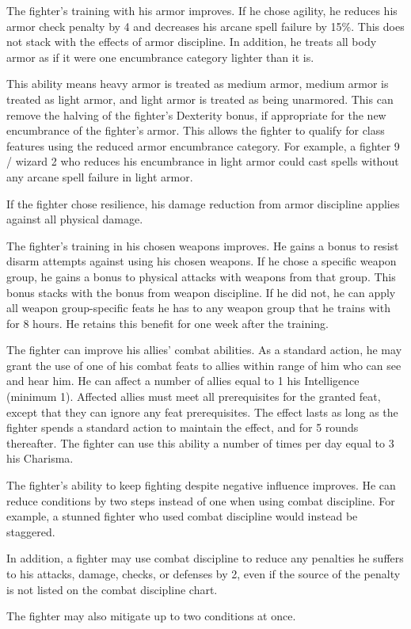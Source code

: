  The fighter's training with his armor improves. If he chose agility, he reduces his armor check penalty by 4 and decreases his arcane spell failure by 15\%. This does not stack with the effects of armor discipline. In addition, he treats all body armor as if it were one encumbrance category lighter than it is.
\par This ability means heavy armor is treated as medium armor, medium armor is treated as light armor, and light armor is treated as being unarmored. This can remove the halving of the fighter's Dexterity bonus, if appropriate for the new encumbrance of the fighter's armor. This allows the fighter to qualify for class features using the reduced armor encumbrance category. For example, a fighter 9 / wizard 2 who reduces his encumbrance in light armor could cast spells without any arcane spell failure in light armor.

If the fighter chose resilience, his damage reduction from armor discipline applies against all physical damage.

 The fighter's training in his chosen weapons improves. He gains a  bonus to resist disarm attempts against using his chosen weapons. If he chose a specific weapon group, he gains a  bonus to physical attacks with weapons from that group. This bonus stacks with the bonus from weapon discipline. If he did not, he can apply all weapon group-specific feats he has to any weapon group that he trains with for 8 hours. He retains this benefit for one week after the training.

 The fighter can improve his allies' combat abilities. As a standard action, he may grant the use of one of his combat feats to allies within \rngclose range of him who can see and hear him. He can affect a number of allies equal to 1 \add his Intelligence (minimum 1). Affected allies must meet all prerequisites for the granted feat, except that they can ignore any feat prerequisites. The effect lasts as long as the fighter spends a standard action to maintain the effect, and for 5 rounds thereafter. The fighter can use this ability a number of times per day equal to 3 \add his Charisma.

 The fighter's ability to keep fighting despite negative influence improves. He can reduce conditions by two steps instead of one when using combat discipline. For example, a stunned fighter who used combat discipline would instead be staggered.
\par In addition, a fighter may use combat discipline to reduce any penalties he suffers to his attacks, damage, checks, or defenses by 2, even if the source of the penalty is not listed on the combat discipline chart.
\par The fighter may also mitigate up to two conditions at once.

